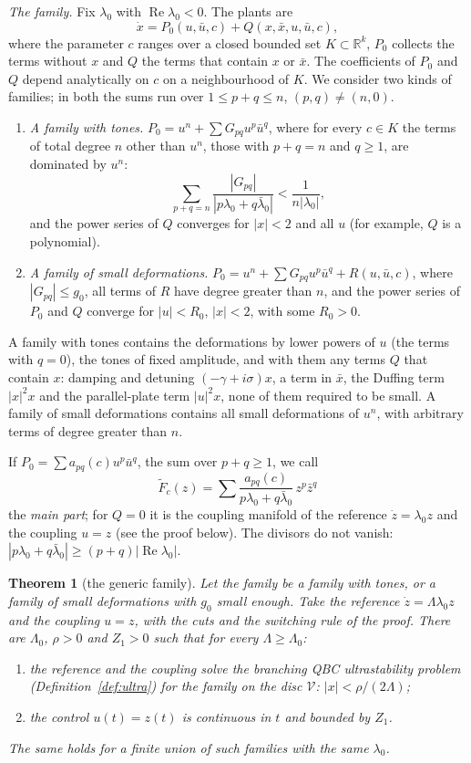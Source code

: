 \documentclass[11pt,reqno]{amsart}
\theoremstyle{plain}
\newtheorem*{theorem}{Theorem}
\theoremstyle{definition}
\theoremstyle{remark}
\begin{document}
\emph{The family.} Fix $\lambda_0$ with $\operatorname{Re}\lambda_0<0$. The plants are
\[
  \dot x=P_0(u,\bar u,c)+Q(x,\bar x,u,\bar u,c),
\]
where the parameter $c$ ranges over a closed bounded set $K\subset\mathbb R^{k}$, $P_0$ collects the terms without $x$ and $Q$ the terms that contain $x$ or $\bar x$. The coefficients of $P_0$ and $Q$ depend analytically on $c$ on a neighbourhood of $K$. We consider two kinds of families; in both the sums run over $1\le p+q\le n$, $(p,q)\ne(n,0)$.
\begin{enumerate}
\item \emph{A family with tones.} $P_0=u^{n}+\sum G_{pq}u^{p}\bar u^{q}$, where for every $c\in K$ the terms of total degree $n$ other than $u^{n}$, those with $p+q=n$ and $q\ge1$, are dominated by $u^{n}$:
\[
  \sum_{p+q=n}\frac{|G_{pq}|}{|p\lambda_0+q\bar\lambda_0|}<\frac1{n|\lambda_0|},
\]
and the power series of $Q$ converges for $|x|<2$ and all $u$ (for example, $Q$ is a polynomial).
\item \emph{A family of small deformations.} $P_0=u^{n}+\sum G_{pq}u^{p}\bar u^{q}+R(u,\bar u,c)$, where $|G_{pq}|\le g_0$, all terms of $R$ have degree greater than $n$, and the power series of $P_0$ and $Q$ converge for $|u|<R_0$, $|x|<2$, with some $R_0>0$.
\end{enumerate}
A family with tones contains the deformations by lower powers of $u$ (the terms with $q=0$), the tones of fixed amplitude, and with them any terms $Q$ that contain $x$: damping and detuning $(-\gamma+i\sigma)x$, a term in $\bar x$, the Duffing term $|x|^{2}x$ and the parallel-plate term $|u|^{2}x$, none of them required to be small. A family of small deformations contains all small deformations of $u^{n}$, with arbitrary terms of degree greater than $n$.

If $P_0=\sum a_{pq}(c)u^{p}\bar u^{q}$, the sum over $p+q\ge1$, we call
\[
  \tilde F_c(z)=\sum\frac{a_{pq}(c)}{p\lambda_0+q\bar\lambda_0}\,z^{p}\bar z^{q}
\]
the \emph{main part}; for $Q=0$ it is the coupling manifold of the reference $\dot z=\lambda_0z$ and the coupling $u=z$ (see the proof below). The divisors do not vanish: $|p\lambda_0+q\bar\lambda_0|\ge(p+q)|\operatorname{Re}\lambda_0|$.

\begin{theorem}[the generic family]\label{thm:generic}
Let the family be a family with tones, or a family of small deformations with $g_0$ small enough. Take the reference $\dot z=\Lambda\lambda_0z$ and the coupling $u=z$, with the cuts and the switching rule of the proof. There are $\Lambda_0$, $\rho>0$ and $Z_1>0$ such that for every $\Lambda\ge\Lambda_0$:
\begin{enumerate}
\item[\textup{(i)}] the reference and the coupling solve the branching QBC ultrastability problem (Definition~\ref{def:ultra}) for the family on the disc $\mathcal V$: $|x|<\rho/(2\Lambda)$;
\item[\textup{(ii)}] the control $u(t)=z(t)$ is continuous in $t$ and bounded by $Z_1$.
\end{enumerate}
The same holds for a finite union of such families with the same $\lambda_0$.
\end{theorem}
\end{document}
